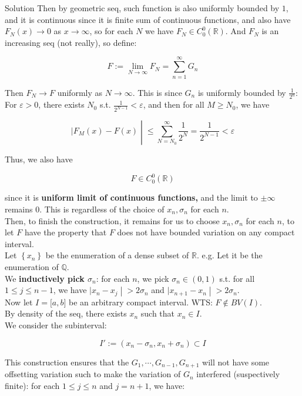 \begin{qlsolution}{Solution}
Then by geometric seq, such function is also uniformly bounded by \(1\), and it is continuous since it is finite sum of continuous functions, and also have \(F_{N}(x)\rightarrow 0\) as \(x\rightarrow\infty\), so for each \(N\) we have \(F_{N} \in C_{0}^{0}(\mathbb{R})\). And \(F_{N}\) is an increasing seq (not really), so define:

\[F := \lim\limits_{N\rightarrow\infty}F_{N} = \sum\limits_{n = 1}^{\infty}G_{n}\]

Then \(F_{N}\rightarrow F\) uniformly as \(N\rightarrow\infty\). This is since \(G_{n}\) is uniformly bounded by \(\frac{1}{2^{n}}\): For \(\varepsilon > 0\), there exists \(N_{0}\) s.t. \(\frac{1}{2^{N - 1}} < \varepsilon\), and then for all \(M \geq N_{0}\), we have

\[\left. |F_{M}(x) - F(x) \middle| \leq \sum\limits_{N = N_{0}}^{\infty}\frac{1}{2^{N}} = \frac{1}{2^{N - 1}} < \varepsilon \right.\]

Thus, we also have

\[F \in C_{0}^{0}(\mathbb{R})\]

since it is \textbf{uniform limit of continuous functions,} and the limit to \(\pm \infty\) remains \(0\). This is regardless of the choice of \(x_{n},\sigma_{n}\) for each \(n\).\\
Then, to finish the construction, it remains for us to choose \(x_{n},\sigma_{n}\) for each \(n\), to let \(F\) have the property that \(F\) does not have bounded variation on any compact interval.\\
Let \(\left\{ x_{n} \right\}\) be the enumeration of a dense subset of \(\mathbb{R}\). e.g. Let it be the enumeration of \(\mathbb{Q}\).\\
We \textbf{inductively pick \(\sigma_{n}\)}: for each \(n\), we pick \(\sigma_{n} \in (0,1)\) s.t. for all \(1 \leq j \leq n - 1\), we have \(\left. |x_{n} - x_{j} \middle| > 2\sigma_{n} \right.\) and \(\left. |x_{n + 1} - x_{n} \middle| > 2\sigma_{n} \right.\).\\
Now let \(I = \lbrack a,b\rbrack\) be an arbitrary compact interval. WTS: \(F \notin BV(I)\).\\
By density of the seq, there exists \(x_{n}\) such that \(x_{n} \in I\).\\
We consider the subinterval:

\[I' := (x_{n} - \sigma_{n},x_{n} + \sigma_{n}) \subset I\]

This construction ensures that the \(G_{1},\cdots,G_{n - 1},G_{n + 1}\) will not have some offsetting variation such to make the variation of \(G_{n}\) interfered (suspectively finite): for each \(1 \leq j \leq n\) and \(j = n + 1\), we have:


\end{qlsolution}
